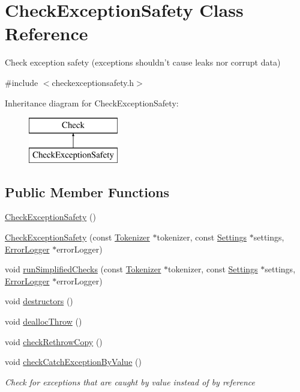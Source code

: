 \hypertarget{class_check_exception_safety}{\section{Check\-Exception\-Safety Class Reference}
\label{class_check_exception_safety}
}


Check exception safety (exceptions shouldn't cause leaks nor corrupt data)  




{\ttfamily \#include $<$checkexceptionsafety.\-h$>$}

Inheritance diagram for Check\-Exception\-Safety\-:\begin{figure}[H]
\begin{center}
\leavevmode
\includegraphics[height=2.000000cm]{class_check_exception_safety}
\end{center}
\end{figure}
\subsection*{Public Member Functions}
\begin{DoxyCompactItemize}
\item 
\hyperlink{class_check_exception_safety_ab903ae17c009f745f7d383117118bdb4}{Check\-Exception\-Safety} ()
\item 
\hyperlink{class_check_exception_safety_aff71308253e8dd67695716dd0e584ba0}{Check\-Exception\-Safety} (const \hyperlink{class_tokenizer}{Tokenizer} $\ast$tokenizer, const \hyperlink{class_settings}{Settings} $\ast$settings, \hyperlink{class_error_logger}{Error\-Logger} $\ast$error\-Logger)
\item 
void \hyperlink{class_check_exception_safety_a1fc4523e8be40da08ed5ad1cfba7382b}{run\-Simplified\-Checks} (const \hyperlink{class_tokenizer}{Tokenizer} $\ast$tokenizer, const \hyperlink{class_settings}{Settings} $\ast$settings, \hyperlink{class_error_logger}{Error\-Logger} $\ast$error\-Logger)
\item 
void \hyperlink{class_check_exception_safety_a4acf12d5ffa61b11a5e286c2ca17311d}{destructors} ()
\item 
void \hyperlink{class_check_exception_safety_ac9d6351a46ffd3f0deb382b70a886a56}{dealloc\-Throw} ()
\item 
void \hyperlink{class_check_exception_safety_ae8d0f7681a615afe9eeb8e5ecc29241f}{check\-Rethrow\-Copy} ()
\item 
void \hyperlink{class_check_exception_safety_ab8fb32a5a84fa95c31c80df7cc35588b}{check\-Catch\-Exception\-By\-Value} ()
\begin{DoxyCompactList}\small\item\em Check for exceptions that are caught by value instead of by reference \end{DoxyCompactList}\end{DoxyCompactItemize}
